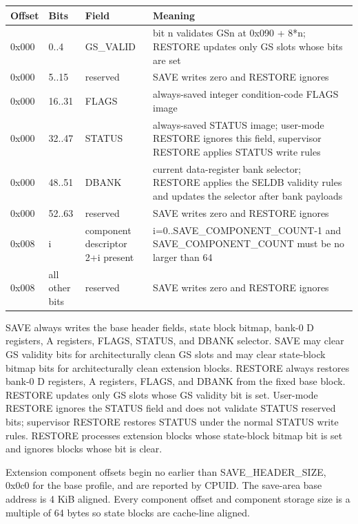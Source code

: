 \documentclass[10pt,twoside]{article}
\begin{document}
\begin{tabularx}{0.985\linewidth}{|p{0.56in}|p{0.62in}|p{1.35in}|X|}
\hline
\textbf{Offset} & \textbf{Bits} & \textbf{Field} & \textbf{Meaning}\\
\hline
0x000 & 0..4 & GS\_VALID & bit n validates GSn at 0x090 + 8*n; RESTORE updates only GS slots whose bits are set\\
\hline
0x000 & 5..15 & reserved & SAVE writes zero and RESTORE ignores\\
\hline
0x000 & 16..31 & FLAGS & always-saved integer condition-code FLAGS image\\
\hline
0x000 & 32..47 & STATUS & always-saved STATUS image; user-mode RESTORE ignores this field, supervisor RESTORE applies STATUS write rules\\
\hline
0x000 & 48..51 & DBANK & current data-register bank selector; RESTORE applies the SELDB validity rules and updates the selector after bank payloads\\
\hline
0x000 & 52..63 & reserved & SAVE writes zero and RESTORE ignores\\
\hline
0x008 & i & component descriptor 2+i present & i=0..SAVE\_COMPONENT\_COUNT-1 and SAVE\_COMPONENT\_COUNT must be no larger than 64\\
\hline
0x008 & all other bits & reserved & SAVE writes zero and RESTORE ignores\\
\hline
\end{tabularx}\endgroup\par\smallskip
\noindent SAVE always writes the base header fields, state block bitmap, bank-0 D registers, A registers, FLAGS, STATUS, and DBANK selector. SAVE may clear GS validity bits for architecturally clean GS slots and may clear state-block bitmap bits for architecturally clean extension blocks. RESTORE always restores bank-0 D registers, A registers, FLAGS, and DBANK from the fixed base block. RESTORE updates only GS slots whose GS validity bit is set. User-mode RESTORE ignores the STATUS field and does not validate STATUS reserved bits; supervisor RESTORE restores STATUS under the normal STATUS write rules. RESTORE processes extension blocks whose state-block bitmap bit is set and ignores blocks whose bit is clear.\par
\noindent Extension component offsets begin no earlier than SAVE\_HEADER\_SIZE, 0x0c0 for the base profile, and are reported by CPUID. The save-area base address is 4 KiB aligned. Every component offset and component storage size is a multiple of 64 bytes so state blocks are cache-line aligned.\par
\end{document}
